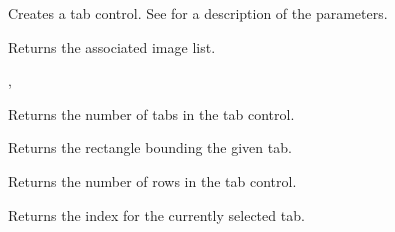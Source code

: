 Creates a tab control. See  for a description
of the parameters.

\label{wxtabctrlgetimagelist}


Returns the associated image list.


, 

\label{wxtabctrlgetitemcount}


Returns the number of tabs in the tab control.

\label{wxtabctrlgetitemrect}


Returns the rectangle bounding the given tab.



\label{wxtabctrlgetrowcount}


Returns the number of rows in the tab control.

\label{wxtabctrlgetselection}


Returns the index for the currently selected tab.





